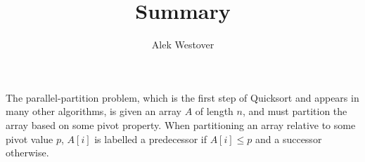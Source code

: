 \documentclass[journal, onecolumn]{IEEEtran}
\title{Summary}
\author{Alek Westover}
\newcommand{\defn}[1]       {{\textit{\textbf{\boldmath #1}}}}
\begin{document}
\maketitle
The parallel-partition problem, which is the first step of Quicksort and appears in many other algorithms, is given an array $A$ of length $n$, and must partition the array based on some pivot property. 
When partitioning an array relative to some pivot value $p$, $A[i]$ is labelled a predecessor if $A[i] \le p$ and a successor otherwise.





\end{document}
